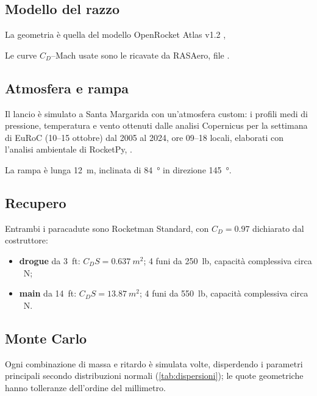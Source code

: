 \documentclass[11pt,a4paper]{article}
\begin{document}
\subsection{Modello del razzo}
La geometria è quella del modello OpenRocket Atlas v1.2
, 

Le curve $C_D$--Mach usate sono le ricavate da RASAero, file
.

\subsection{Atmosfera e rampa}
Il lancio è simulato a Santa Margarida con un'atmosfera
custom: i profili medi di pressione, temperatura e vento ottenuti dalle analisi Copernicus per la
settimana di EuRoC (10--15 ottobre) dal 2005 al 2024, ore 09--18 locali, elaborati con l'analisi ambientale di
RocketPy, .

La rampa è lunga \SI{12}{m}, inclinata di \SI{84}{\degree} in direzione \SI{145}{\degree}.

\subsection{Recupero}
Entrambi i paracadute sono Rocketman Standard, con $C_D = \num{0.97}$ dichiarato dal costruttore:
\begin{itemize}
  \item \textbf{drogue} da \SI{3}{ft}: $C_D S = \SI{0.637}{m^2}$; 4 funi da \SI{250}{lb}, capacità complessiva
        circa \DrogueLinesCapacity~N;
  \item \textbf{main} da \SI{14}{ft}: $C_D S = \SI{13.87}{m^2}$; 4 funi da \SI{550}{lb}, capacità complessiva
        circa \MainLinesCapacity~N.
\end{itemize}

\subsection{Monte Carlo}
Ogni combinazione di massa e ritardo è simulata \NSims{} volte, disperdendo i parametri principali secondo
distribuzioni normali (\autoref{tab:dispersioni}); le quote geometriche hanno tolleranze
dell'ordine del millimetro.
\end{document}
